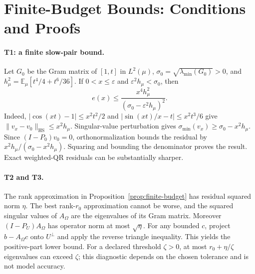 \section{Finite-Budget Bounds: Conditions and Proofs}
\label{sec:budget-proofs}

\paragraph{T1: a finite slow-pair bound.}
Let $G_0$ be the Gram matrix of $[1,t]$ in $L^2(\mu)$,
$\sigma_0=\sqrt{\lambda_{\min}(G_0)}>0$, and
$h_\mu^2=\mathbb E_\mu[t^4/4+t^6/36]$.
If $0<x\le\varepsilon$ and $\varepsilon^2h_\mu<\sigma_0$, then
\begin{equation}
e(x)\le\frac{x^4h_\mu^2}{(\sigma_0-\varepsilon^2h_\mu)^2}.
\end{equation}
Indeed, $|\cos(xt)-1|\le x^2t^2/2$ and
$|\sin(xt)/x-t|\le x^2t^3/6$ give
$\|v_x-v_0\|_{\mathrm{HS}}\le x^2h_\mu$.
Singular-value perturbation gives
$\sigma_{\min}(v_x)\ge\sigma_0-x^2h_\mu$.
Since $(I-P_0)v_0=0$, orthonormalization bounds the residual by
$x^2h_\mu/(\sigma_0-x^2h_\mu)$. Squaring and bounding the denominator
proves the result. Exact weighted-QR residuals can be substantially sharper.

\paragraph{T2 and T3.}
The rank approximation in Proposition~\ref{prop:finite-budget} has residual
squared norm $\eta$. The best rank-$r_0$ approximation cannot be worse, and the
squared singular values of $A_\Omega$ are the eigenvalues of its Gram matrix.
Moreover $(I-P_U)A_\Omega$ has operator norm at most $\sqrt\eta$.
For any bounded $c$, project $b-A_\Omega c$ onto $U^\perp$ and apply the
reverse triangle inequality. This yields the positive-part lower bound.
For a declared threshold $\zeta>0$, at most $r_0+\eta/\zeta$ eigenvalues can
exceed $\zeta$; this diagnostic depends on the chosen tolerance and is not
model accuracy.

